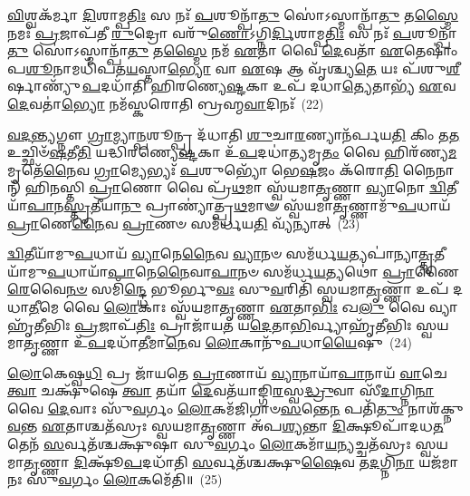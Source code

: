 {\anuvakamend[{𑌓𑌷᳴𑌧\-\ul{𑌯𑌃} 𑌕𑌞𑍍𑌜𑍁᳴𑌹𑍋𑌤𑌿 𑌸𑍍𑌵\-\ul{𑌪}\-𑌤𑍍𑌯𑌾\-\ul{𑌯𑌾}\-𑌷𑍍𑌟𑌾𑌦᳴𑌶 𑌚}]}%

\-\ul{𑌵𑌿}\-𑌶𑍍𑌵𑌕᳴𑌰𑍍𑌮𑌾 \ul{𑌦𑌿}\-𑌶𑌾𑌮𑍍𑌪\-\ul{𑌤𑌿𑌃} 𑌸 𑌨𑌃᳴ \ul{𑌪}\-𑌶𑍂𑌨𑍍𑌪𑌾᳴\-\ul{𑌤𑍁} 𑌸𑍋॑\-𑌽𑌸𑍍𑌮𑌾𑌨𑍍𑌪𑌾᳴\-\ul{𑌤𑍁} 𑌤\-\ul{𑌸𑍍𑌮𑍈} 𑌨𑌮𑌃᳴ \ul{𑌪𑍍𑌰}\-𑌜𑌾𑌪᳴𑌤𑍀 \ul{𑌰𑍁}\-𑌦𑍍𑌰𑍋 𑌵𑌰𑍁᳴\-\ul{𑌣𑍋}\-\-𑌽𑌗𑍍𑌨𑌿\-\ul{𑌰𑍍𑌦𑌿}\-𑌶𑌾𑌮𑍍𑌪\-\ul{𑌤𑌿𑌃} 𑌸 𑌨𑌃᳴ \ul{𑌪}\-𑌶𑍂𑌨𑍍𑌪𑌾᳴\-\ul{𑌤𑍁} 𑌸𑍋॑\-𑌽𑌸𑍍𑌮𑌾𑌨𑍍𑌪𑌾᳴\-\ul{𑌤𑍁} 𑌤\-\ul{𑌸𑍍𑌮𑍈} 𑌨𑌮᳴ \ul{𑌏}\-𑌤𑌾 𑌵𑍈 \ul{𑌦𑍇}\-𑌵𑌤𑌾᳴ \ul{𑌏}\-𑌤𑍇𑌷𑌾𑌂॑ 𑌪\-\ul{𑌶𑍂}\-𑌨𑌾𑌮𑌧𑌿᳴𑌪𑌤\-\ul{𑌯}\-𑌸𑍍𑌤𑌾\-\ul{𑌭𑍍𑌯𑍋} 𑌵𑌾 \ul{𑌏}\-𑌷 𑌆 𑌵𑍃᳴𑌶𑍍𑌚𑍍𑌯\-\ul{𑌤𑍇} 𑌯𑌃 𑌪᳴𑌶𑍁\-\ul{𑌶𑍀}\-𑌰𑍍\mbox{}𑌷𑌾𑌣𑍍𑌯𑍁᳴\-\ul{𑌪}\-𑌦𑌧𑌾᳴𑌤𑌿 𑌹𑌿𑌰𑌣𑍍𑌯𑍇\-\ul{𑌷𑍍𑌟}\-𑌕𑌾 𑌉𑌪᳴ 𑌦𑌧𑌾\-\ul{𑌤𑍍𑌯𑍇}\-𑌤𑌾𑌭𑍍𑌯᳴ \ul{𑌏}\-𑌵 \ul{𑌦𑍇}\-𑌵𑌤𑌾॑\-\ul{𑌭𑍍𑌯𑍋} 𑌨𑌮᳴𑌸𑍍𑌕𑌰𑍋𑌤𑌿 𑌬𑍍𑌰𑌹𑍍𑌮\-\ul{𑌵𑌾}\-𑌦𑌿𑌨𑌃᳴~(22)

\-\ul{𑌵}\-\-\ul{𑌦}\-\-\ul{𑌨𑍍𑌤𑍍𑌯}\-𑌗𑍍𑌨𑍗 \ul{𑌗𑍍𑌰𑌾}\-𑌮𑍍𑌯𑌾\-\ul{𑌨𑍍𑌪}\-𑌶𑍂𑌨𑍍𑌪𑍍𑌰 𑌦᳴𑌧𑌾𑌤𑌿 \ul{𑌶𑍁}\-𑌚𑌾\-\ul{𑌰}\-𑌣𑍍𑌯𑌾𑌨᳴𑌰𑍍𑌪𑌯\-\ul{𑌤𑌿} 𑌕𑌿𑌂 𑌤\-\ul{𑌤} 𑌉𑌚𑍍𑌛𑌿𑍞᳴\-\ul{𑌷}\-𑌤𑍀\-\ul{𑌤𑌿} 𑌯𑌦𑍍𑌧𑌿᳴𑌰𑌣𑍍𑌯𑍇\-\ul{𑌷𑍍𑌟}\-𑌕𑌾 𑌉᳴\-\ul{𑌪}\-𑌦𑌧𑌾॑\-\ul{𑌤𑍍𑌯}\-𑌮𑍃\-\ul{𑌤𑌂} 𑌵𑍈 𑌹𑌿𑌰᳴𑌣𑍍𑌯\-\ul{𑌮}\-𑌮𑍃𑌤𑍇᳴\-\ul{𑌨𑍈}\-𑌵 \ul{𑌗𑍍𑌰𑌾}\-𑌮𑍍𑌯𑍇𑌭𑍍𑌯𑌃᳴ \ul{𑌪}\-𑌶𑍁𑌭𑍍𑌯𑍋᳴ 𑌭𑍇\-\ul{𑌷}\-𑌜𑌂 𑌕᳴𑌰𑍋\-\ul{𑌤𑌿} 𑌨𑍈𑌨𑌾𑌨𑍍᳴ 𑌹𑌿𑌨𑌸𑍍𑌤𑌿 \ul{𑌪𑍍𑌰𑌾}\-𑌣𑍋 𑌵𑍈 𑌪𑍍𑌰᳴\-\ul{𑌥}\-𑌮𑌾 𑌸𑍍𑌵᳴𑌯𑌮𑌾\-\ul{𑌤𑍃}\-𑌣𑍍𑌣𑌾 \ul{𑌵𑍍𑌯𑌾}\-𑌨𑍋 \ul{𑌦𑍍𑌵𑌿}\-𑌤𑍀𑌯𑌾᳴\-\ul{𑌪𑌾}\-𑌨\-\ul{𑌸𑍍𑌤𑍃}\-𑌤𑍀𑌯𑌾\-\ul{𑌨𑍁} 𑌪𑍍𑌰𑌾𑌣𑍍𑌯𑌾॑𑌤𑍍𑌪𑍍𑌰\-\ul{𑌥}\-𑌮𑌾𑍟 𑌸𑍍𑌵᳴𑌯𑌮𑌾\-\ul{𑌤𑍃}\-𑌣𑍍𑌣𑌾𑌮𑍁᳴\-\ul{𑌪}\-𑌧𑌾𑌯᳴ \ul{𑌪𑍍𑌰𑌾}\-𑌣𑍇\-\ul{𑌨𑍈}\-𑌵 \ul{𑌪𑍍𑌰𑌾}\-𑌣𑍞 𑌸𑌮᳴𑌰𑍍𑌧𑌯\-\ul{𑌤𑌿} 𑌵𑍍𑌯᳴𑌨𑍍𑌯𑌾𑌤𑍍~(23)

\-\ul{𑌦𑍍𑌵𑌿}\-𑌤𑍀𑌯𑌾᳴𑌮𑍁\-\ul{𑌪}\-𑌧𑌾𑌯᳴ \ul{𑌵𑍍𑌯𑌾}\-𑌨𑍇\-\ul{𑌨𑍈}\-𑌵 \ul{𑌵𑍍𑌯𑌾}\-𑌨𑍞 𑌸𑌮᳴𑌰𑍍𑌧\-\ul{𑌯}\-𑌤𑍍𑌯𑌪𑌾॑𑌨𑍍𑌯𑌾\-\ul{𑌤𑍍𑌤𑍃}\-𑌤𑍀𑌯𑌾᳴𑌮𑍁\-\ul{𑌪}\-𑌧𑌾𑌯𑌾᳴\-\ul{𑌪𑌾}\-𑌨𑍇\-\ul{𑌨𑍈}\-𑌵𑌾\-\ul{𑌪𑌾}\-𑌨𑍞 𑌸𑌮᳴𑌰𑍍𑌧\-\ul{𑌯}\-𑌤𑍍𑌯𑌥𑍋॑ \ul{𑌪𑍍𑌰𑌾}\-𑌣𑍈\-\ul{𑌰𑍇}\-𑌵𑍈\-\ul{𑌨}\-\-\ul{𑍞} 𑌸𑌮𑌿᳴\-\ul{𑌨𑍍𑌦𑍍𑌧𑍇} 𑌭𑍂𑌰𑍍𑌭𑍁\-\ul{𑌵𑌃} 𑌸𑍁\-\ul{𑌵}\-𑌰𑌿𑌤𑌿᳴ 𑌸𑍍𑌵𑌯𑌮𑌾\-\ul{𑌤𑍃}\-𑌣𑍍𑌣𑌾 𑌉𑌪᳴ 𑌦𑌧𑌾\-\ul{𑌤𑍀}\-𑌮𑍇 𑌵𑍈 \ul{𑌲𑍋}\-𑌕𑌾𑌃 𑌸𑍍𑌵᳴𑌯𑌮𑌾\-\ul{𑌤𑍃}\-𑌣𑍍𑌣𑌾 \ul{𑌏}\-𑌤𑌾\-\ul{𑌭𑌿𑌃} 𑌖\-\ul{𑌲𑍁} 𑌵𑍈 𑌵𑍍𑌯𑌾𑌹𑍃᳴𑌤𑍀𑌭𑌿𑌃 \ul{𑌪𑍍𑌰}\-𑌜𑌾𑌪᳴\-\ul{𑌤𑌿𑌃} 𑌪𑍍𑌰𑌾𑌜𑌾᳴𑌯\-\ul{𑌤} 𑌯\-\ul{𑌦𑍇}\-𑌤𑌾\-\ul{𑌭𑌿}\-𑌰𑍍𑌵𑍍𑌯𑌾𑌹𑍃᳴𑌤𑍀𑌭𑌿𑌃 𑌸𑍍𑌵𑌯𑌮𑌾\-\ul{𑌤𑍃}\-𑌣𑍍𑌣𑌾 𑌉᳴\-\ul{𑌪}\-𑌦𑌧𑌾᳴\-\ul{𑌤𑍀}\-𑌮𑌾\-\ul{𑌨𑍇}\-𑌵 \ul{𑌲𑍋}\-𑌕𑌾𑌨𑍁᳴\-\ul{𑌪}\-𑌧𑌾\-\ul{𑌯𑍈}\-𑌷𑍁~(24)

\-\ul{𑌲𑍋}\-𑌕𑍇𑌷𑍍𑌵\-\ul{𑌧𑌿} 𑌪𑍍𑌰 𑌜𑌾᳴𑌯𑌤𑍇 \ul{𑌪𑍍𑌰𑌾}\-𑌣𑌾𑌯᳴ \ul{𑌵𑍍𑌯𑌾}\-𑌨𑌾𑌯𑌾᳴\-\ul{𑌪𑌾}\-𑌨𑌾𑌯᳴ \ul{𑌵𑌾}\-𑌚𑍇 \ul{𑌤𑍍𑌵𑌾} 𑌚𑌕𑍍𑌷𑍁᳴𑌷𑍇 \ul{𑌤𑍍𑌵𑌾} 𑌤𑌯𑌾᳴ \ul{𑌦𑍇}\-𑌵𑌤᳴𑌯𑌾𑌙𑍍𑌗𑌿\-\ul{𑌰}\-𑌸𑍍𑌵\-\ul{𑌦𑍍𑌧𑍍𑌰𑍁}\-𑌵𑌾 𑌸𑍀᳴\-\ul{𑌦𑌾}\-𑌗𑍍𑌨𑌿\-\ul{𑌨𑌾} 𑌵𑍈 \ul{𑌦𑍇}\-𑌵𑌾𑌃 𑌸𑍁᳴\-\ul{𑌵}\-𑌰𑍍𑌗𑌂 \ul{𑌲𑍋}\-𑌕𑌮᳴𑌜𑌿𑌗𑌾𑍞\-\ul{𑌸}\-𑌨𑍍𑌤𑍇\-\ul{𑌨} 𑌪𑌤𑌿᳴\-\ul{𑌤𑍁𑌂} 𑌨𑌾𑌶᳴𑌕𑍍𑌨𑍁\-\ul{𑌵}\-𑌨𑍍𑌤 \ul{𑌏}\-𑌤𑌾𑌶𑍍𑌚𑌤᳴𑌸𑍍𑌰𑌃 𑌸𑍍𑌵𑌯𑌮𑌾\-\ul{𑌤𑍃}\-𑌣𑍍𑌣𑌾 𑌅᳴𑌪\-\ul{𑌶𑍍𑌯}\-𑌨𑍍𑌤𑌾 \ul{𑌦𑌿}\-𑌕𑍍𑌷𑍂𑌪𑌾᳴𑌦𑌧\-\ul{𑌤} 𑌤𑍇𑌨᳴ \ul{𑌸}\-𑌰𑍍𑌵𑌤᳴𑌶𑍍𑌚𑌕𑍍𑌷𑍁𑌷𑌾 𑌸𑍁\-\ul{𑌵}\-𑌰𑍍𑌗𑌂 \ul{𑌲𑍋}\-𑌕𑌮𑌾᳴\-\ul{𑌯}\-\-\ul{𑌨𑍍}\-𑌯𑌚𑍍𑌚𑌤᳴𑌸𑍍𑌰𑌃 𑌸𑍍𑌵𑌯𑌮𑌾\-\ul{𑌤𑍃}\-𑌣𑍍𑌣𑌾 \ul{𑌦𑌿}\-𑌕𑍍𑌷𑍂᳴\-\ul{𑌪}\-𑌦𑌧𑌾᳴𑌤𑌿 \ul{𑌸}\-𑌰𑍍𑌵𑌤᳴𑌶𑍍𑌚𑌕𑍍𑌷𑍁\-\ul{𑌷𑍈}\-𑌵 𑌤\-\ul{𑌦}\-𑌗𑍍𑌨𑌿\-\ul{𑌨𑌾} 𑌯𑌜᳴𑌮𑌾𑌨𑌃 𑌸𑍁\-\ul{𑌵}\-𑌰𑍍𑌗𑌂 \ul{𑌲𑍋}\-𑌕𑌮𑍇᳴𑌤𑌿॥~(25)

